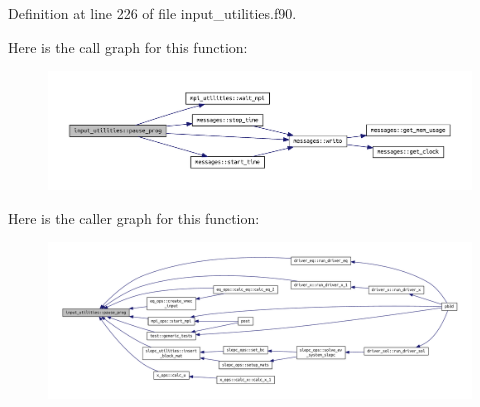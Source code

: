 Definition at line 226 of file input\+\_\+utilities.\+f90.

Here is the call graph for this function\+:\nopagebreak
\begin{figure}[H]
\begin{center}
\leavevmode
\includegraphics[width=350pt]{namespaceinput__utilities_a71bd36f063d55ab62c7a37864aef1185_cgraph}
\end{center}
\end{figure}
Here is the caller graph for this function\+:\nopagebreak
\begin{figure}[H]
\begin{center}
\leavevmode
\includegraphics[width=350pt]{namespaceinput__utilities_a71bd36f063d55ab62c7a37864aef1185_icgraph}
\end{center}
\end{figure}

